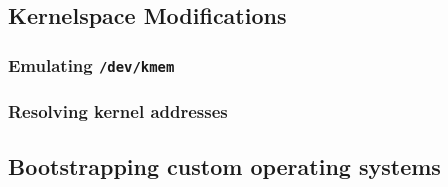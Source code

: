 \subsection{Kernelspace Modifications}

\subsubsection{Emulating \texttt{/dev/kmem}}

\subsubsection{Resolving kernel addresses}





\subsection{Bootstrapping custom operating systems}



